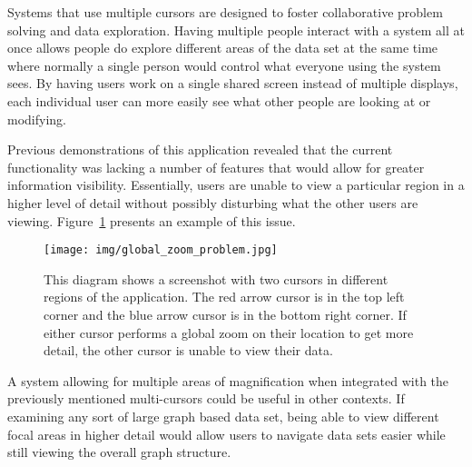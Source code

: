Systems that use multiple cursors are designed to foster collaborative problem solving and data exploration. Having multiple people interact with a system all at once allows people do explore different areas of the data set at the same time where normally a single person would control what everyone using the system sees. By having users work on a single shared screen instead of multiple displays, each individual user can more easily see what other people are looking at or
modifying.

Previous demonstrations of this application revealed that the current functionality was lacking a number of features that would allow for greater information visibility. Essentially, users are unable to view a particular region in a higher level of detail without possibly disturbing what the other users are viewing. Figure~\ref{fig:example_problem} presents an example of this issue.

\begin{figure}[htp] \centering
    \texttt{[image: img/global\_zoom\_problem.jpg]}
    \caption[Loss of Context]{This diagram shows a screenshot with two cursors in different regions of the application. The red arrow cursor is in the top left corner and the blue arrow cursor is in the bottom right corner. If either cursor performs a global zoom on their location to get more detail, the other cursor is unable to view their data.}
    \label{fig:example_problem}
\end{figure}

A system allowing for multiple areas of magnification when integrated with the previously mentioned multi-cursors could be useful in other contexts. If examining any sort of large graph based data set, being able to view different focal areas in higher detail would allow users to navigate data sets easier while still viewing the overall graph structure.

